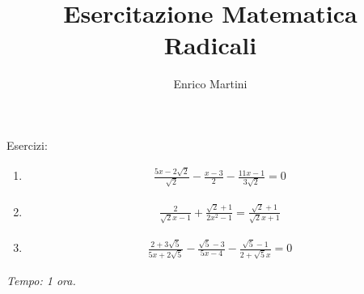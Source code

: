 \documentclass[a4paper]{article}
\title{Esercitazione Matematica\\ Radicali}
\author{Enrico Martini}
\begin{document}
\maketitle
\thispagestyle{empty}

Esercizi:

\begin{enumerate}
    \item \begin{align*}
        \frac{5x-2\sqrt{2}}{\sqrt{2}}-\frac{x-3}{2}-\frac{11x-1}{3\sqrt{2}}=0
    \end{align*}
    \item \begin{align*}
        \frac{2}{\sqrt{2}x-1}+\frac{\sqrt{2}+1}{2x^2-1}=\frac{\sqrt{2}+1}{\sqrt{2}x+1}
    \end{align*}
    \item \begin{align*}
        \frac{2+3\sqrt{5}}{5x+2\sqrt{5}}-\frac{\sqrt{5}-3}{5x-4}-\frac{\sqrt{5}-1}{2+\sqrt{5}x}=0
    \end{align*}
\end{enumerate}
\textit{Tempo: 1 ora.}
\end{document}

